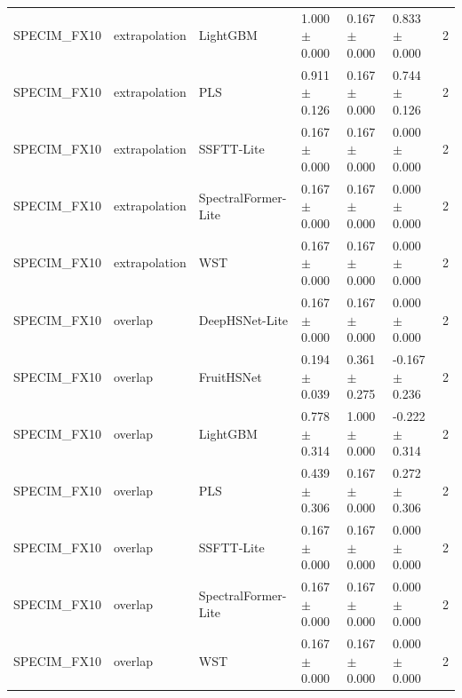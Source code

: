 \begin{table}[t]
\begin{tabular}{lllllll}
SPECIM\_FX10 & extrapolation & LightGBM & 1.000 $\pm$ 0.000 & 0.167 $\pm$ 0.000 & 0.833 $\pm$ 0.000 & 2 \\
SPECIM\_FX10 & extrapolation & PLS & 0.911 $\pm$ 0.126 & 0.167 $\pm$ 0.000 & 0.744 $\pm$ 0.126 & 2 \\
SPECIM\_FX10 & extrapolation & SSFTT-Lite & 0.167 $\pm$ 0.000 & 0.167 $\pm$ 0.000 & 0.000 $\pm$ 0.000 & 2 \\
SPECIM\_FX10 & extrapolation & SpectralFormer-Lite & 0.167 $\pm$ 0.000 & 0.167 $\pm$ 0.000 & 0.000 $\pm$ 0.000 & 2 \\
SPECIM\_FX10 & extrapolation & WST & 0.167 $\pm$ 0.000 & 0.167 $\pm$ 0.000 & 0.000 $\pm$ 0.000 & 2 \\
SPECIM\_FX10 & overlap & DeepHSNet-Lite & 0.167 $\pm$ 0.000 & 0.167 $\pm$ 0.000 & 0.000 $\pm$ 0.000 & 2 \\
SPECIM\_FX10 & overlap & FruitHSNet & 0.194 $\pm$ 0.039 & 0.361 $\pm$ 0.275 & -0.167 $\pm$ 0.236 & 2 \\
SPECIM\_FX10 & overlap & LightGBM & 0.778 $\pm$ 0.314 & 1.000 $\pm$ 0.000 & -0.222 $\pm$ 0.314 & 2 \\
SPECIM\_FX10 & overlap & PLS & 0.439 $\pm$ 0.306 & 0.167 $\pm$ 0.000 & 0.272 $\pm$ 0.306 & 2 \\
SPECIM\_FX10 & overlap & SSFTT-Lite & 0.167 $\pm$ 0.000 & 0.167 $\pm$ 0.000 & 0.000 $\pm$ 0.000 & 2 \\
SPECIM\_FX10 & overlap & SpectralFormer-Lite & 0.167 $\pm$ 0.000 & 0.167 $\pm$ 0.000 & 0.000 $\pm$ 0.000 & 2 \\
SPECIM\_FX10 & overlap & WST & 0.167 $\pm$ 0.000 & 0.167 $\pm$ 0.000 & 0.000 $\pm$ 0.000 & 2 \\
\hline
\end{tabular}
\end{table}